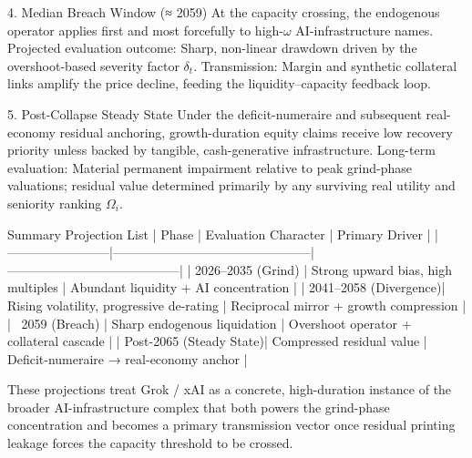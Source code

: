 4. Median Breach Window (≈ 2059)
At the capacity crossing, the endogenous operator applies first and most forcefully to high-\(\omega\) AI-infrastructure names.
Projected evaluation outcome: Sharp, non-linear drawdown driven by the overshoot-based severity factor \(\delta_t\).
Transmission: Margin and synthetic collateral links amplify the price decline, feeding the liquidity–capacity feedback loop.

5. Post-Collapse Steady State
Under the deficit-numeraire and subsequent real-economy residual anchoring, growth-duration equity claims receive low recovery priority unless backed by tangible, cash-generative infrastructure.
Long-term evaluation: Material permanent impairment relative to peak grind-phase valuations; residual value determined primarily by any surviving real utility and seniority ranking \(\Omega_i\).

Summary Projection List
| Phase                  | Evaluation Character                          | Primary Driver                          |
|------------------------|-----------------------------------------------|-----------------------------------------|
| 2026–2035 (Grind)     | Strong upward bias, high multiples            | Abundant liquidity + AI concentration   |
| 2041–2058 (Divergence)| Rising volatility, progressive de-rating      | Reciprocal mirror + growth compression  |
| ~2059 (Breach)        | Sharp endogenous liquidation                  | Overshoot operator + collateral cascade |
| Post-2065 (Steady State)| Compressed residual value                    | Deficit-numeraire → real-economy anchor |

These projections treat Grok / xAI as a concrete, high-duration instance of the broader AI-infrastructure complex that both powers the grind-phase concentration and becomes a primary transmission vector once residual printing leakage forces the capacity threshold to be crossed.
